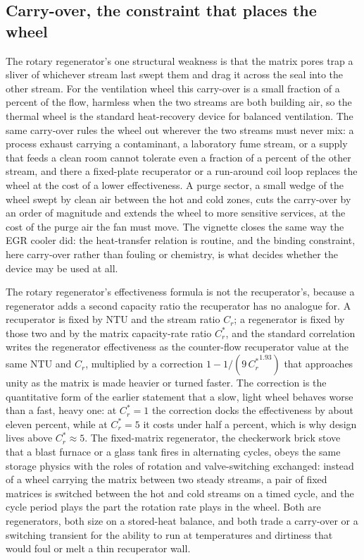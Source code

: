\subsection{Carry-over, the constraint that places the wheel}

The rotary regenerator's one structural weakness is that the matrix pores trap a
sliver of whichever stream last swept them and drag it across the seal into the
other stream. For the ventilation wheel this carry-over is a small fraction of a
percent of the flow, harmless when the two streams are both building air, so the
thermal wheel is the standard heat-recovery device for balanced ventilation. The
same carry-over rules the wheel out wherever the two streams must never mix: a
process exhaust carrying a contaminant, a laboratory fume stream, or a supply that
feeds a clean room cannot tolerate even a fraction of a percent of the other
stream, and there a fixed-plate recuperator or a run-around coil loop replaces the
wheel at the cost of a lower effectiveness. A purge sector, a small wedge of the
wheel swept by clean air between the hot and cold zones, cuts the carry-over by an
order of magnitude and extends the wheel to more sensitive services, at the cost
of the purge air the fan must move. The vignette closes the same way the EGR cooler
did: the heat-transfer relation is routine, and the binding constraint, here
carry-over rather than fouling or chemistry, is what decides whether the device
may be used at all.

\begin{mastery}
The rotary regenerator's effectiveness formula is not the recuperator's, because a
regenerator adds a second capacity ratio the recuperator has no analogue for. A
recuperator is fixed by $\text{NTU}$ and the stream ratio $C_r$; a regenerator is
fixed by those two and by the matrix capacity-rate ratio $C_r^\ast$, and the
standard correlation writes the regenerator effectiveness as the counter-flow
recuperator value at the same $\text{NTU}$ and $C_r$, multiplied by a correction
$1 - 1/(9\,{C_r^\ast}^{1.93})$ that approaches unity as the matrix is made heavier
or turned faster. The correction is the quantitative form of the earlier statement
that a slow, light wheel behaves worse than a fast, heavy one: at $C_r^\ast = 1$
the correction docks the effectiveness by about eleven percent, while at
$C_r^\ast = 5$ it costs under half a percent, which is why design lives above
$C_r^\ast \approx 5$. The fixed-matrix regenerator, the checkerwork brick stove
that a blast furnace or a glass tank fires in alternating cycles, obeys the same
storage physics with the roles of rotation and valve-switching exchanged: instead
of a wheel carrying the matrix between two steady streams, a pair of fixed matrices
is switched between the hot and cold streams on a timed cycle, and the cycle period
plays the part the rotation rate plays in the wheel. Both are regenerators, both
size on a stored-heat balance, and both trade a carry-over or a switching
transient for the ability to run at temperatures and dirtiness that would foul or
melt a thin recuperator wall.
\end{mastery}

